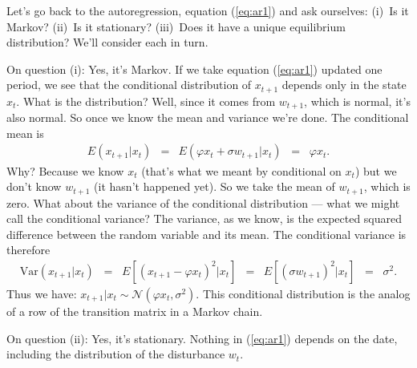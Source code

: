 \documentclass[11pt]{article}
\begin{document}
Let's go back to the autoregression, equation (\ref{eq:ar1})
and ask ourselves:  (i)~Is it Markov?
(ii)~Is it stationary?
(iii)~Does it have a unique equilibrium distribution?
We'll consider each in turn.

On question (i): Yes, it's Markov.
If we take equation (\ref{eq:ar1}) updated one period,
we see that the conditional distribution of $x_{t+1}$ depends only in the state $x_t$.
What is the distribution?  Well, since
it comes from $w_{t+1}$, which is normal, it's also normal.
So once we know the mean and variance we're done.
The conditional mean is
\begin{eqnarray*}
    E ( x_{t+1} | x_t )
            &=& E (\varphi x_t + \sigma w_{t+1} | x_t )
                \;\;=\;\; \varphi x_t .
\end{eqnarray*}
Why?  Because we know $x_t$ (that's what we meant by conditional on $x_t$)
but we don't know $w_{t+1}$ (it hasn't happened yet).
So we take the mean of $w_{t+1}$, which is zero.
What about the variance of the conditional distribution --- what we might call the conditional variance?
The variance, as we know,
 is the expected squared difference between the random variable and its mean.
The conditional variance is therefore
\begin{eqnarray*}
    \mbox{Var}(x_{t+1} | x_t ) \;\;=\;\;
    E \left[(x_{t+1} - \varphi x_t)^2 | x_t \right]
            &=& E \left[(\sigma w_{t+1})^2 | x_t \right]
                \;\;=\;\; \sigma^2 .
\end{eqnarray*}
Thus we have:  $x_{t+1} | x_t \sim \mathcal{N} (\varphi x_t, \sigma^2)$.
This conditional distribution is the analog of a row
of the transition matrix in a Markov chain.

On question (ii):  Yes, it's stationary.
Nothing in (\ref{eq:ar1}) depends on the date, including the distribution
of the disturbance $w_t$.
\end{document}
